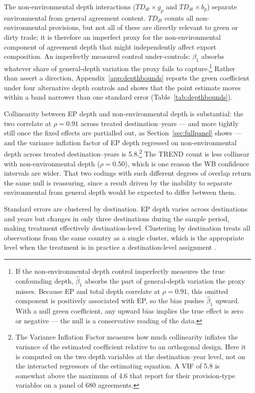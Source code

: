 \documentclass[12pt]{article}
\begin{document}
The non-environmental depth interactions ($TD_{dt} \times g_p$ and
$TD_{dt} \times b_p$) separate environmental from general agreement content.
$TD_{dt}$ counts all non-environmental provisions, but not all of these are
directly relevant to green or dirty trade; it is therefore an imperfect proxy for
the non-environmental component of agreement depth that might independently affect
export composition. An imperfectly measured control under-controls: $\beta_1$
absorbs whatever share of general-depth variation the proxy fails to
capture.\footnote{If the non-environmental depth control imperfectly measures the true confounding depth, $\hat{\beta}_1$ absorbs the part of general-depth variation the proxy misses. Because EP and total depth correlate at $\rho = 0.91$, this omitted component is positively associated with EP, so the bias pushes $\hat{\beta}_1$ upward. With a null green coefficient, any upward bias implies the true effect is zero or negative --- the null is a conservative reading of the data.} Rather than assert a direction, Appendix~\ref{app:depthbounds} reports the
green coefficient under four alternative depth controls and shows that the point
estimate moves within a band narrower than one standard error
(Table~\ref{tab:depthbounds}).

Collinearity between EP depth and non-environmental depth is substantial: the two correlate at $\rho = 0.91$ across treated destination--years --- and more tightly still once the fixed effects are partialled out, as Section~\ref{sec:fullpanel} shows --- and the variance inflation factor of EP depth regressed on non-environmental depth across treated destination--years is 5.8.\footnote{The Variance Inflation Factor measures how much collinearity inflates the variance of the estimated coefficient relative to an orthogonal design. Here it is computed on the two depth variables at the destination--year level, not on the interacted regressors of the estimating equation. A VIF of 5.8 is somewhat above the maximum of 4.6 that \citet{brandi2020} report for their provision-type variables on a panel of 680 agreements.}
The TREND count is less
collinear with non-environmental depth ($\rho = 0.50$), which is one reason the WB
confidence intervals are wider. That two codings with such different degrees of
overlap return the same null is reassuring, since a result driven by the inability
to separate environmental from general depth would be expected to differ between
them.

Standard errors are clustered by destination. EP depth varies across destinations and years but changes in only three destinations during the sample period, making treatment effectively destination-level. Clustering by destination treats all observations from the same country as a single cluster, which is the appropriate level when the treatment is in practice a destination-level assignment \citep{abadie2023}.
\end{document}

